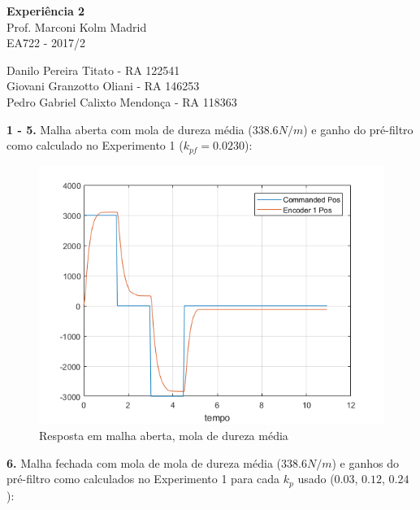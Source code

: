 \documentclass[a4paper,11pt]{article}
\begin{document}
\begin{center}
\textbf{Experiência 2} \\
\hspace{5pt}
Prof. Marconi Kolm Madrid \\
EA722 - 2017/2
\end{center}

\begin{center}
Danilo Pereira Titato - RA 122541 \\
Giovani Granzotto Oliani - RA 146253 \\
Pedro Gabriel Calixto Mendonça - RA 118363 \\
\end{center}

\textbf{1 - 5.}
Malha aberta com mola de dureza média ($338.6 N/m$) e ganho do pré-filtro como
calculado no Experimento 1 ($k_{pf} = 0.0230$):

\begin{figure}[H]
\centering
\includegraphics{exp02e05}
\caption{Resposta em malha aberta, mola de dureza média}
\end{figure}

\hspace{5pt}

\textbf{6.}
Malha fechada com mola de mola de dureza média ($338.6 N/m$) e ganhos do
pré-filtro como calculados no Experimento 1 para cada $k_p$ usado
($0.03$, $0.12$, $0.24$):
\end{document}
